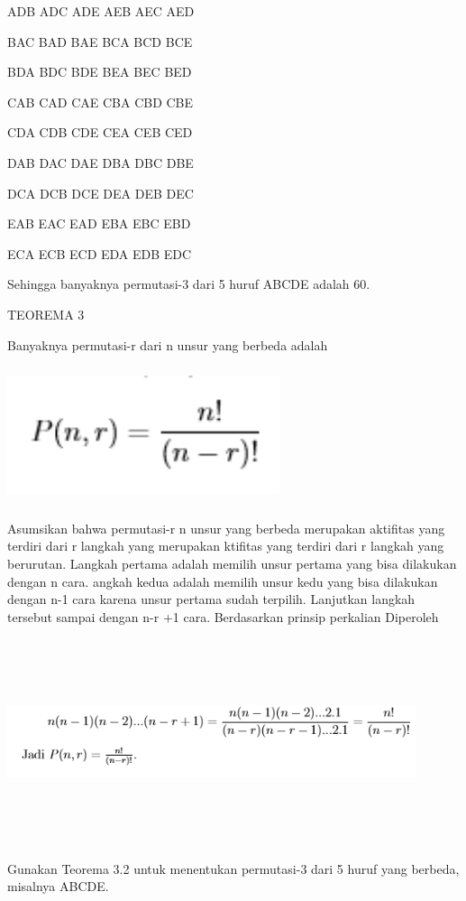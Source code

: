 \documentclass[11pt,fleqn]{book} %
\begin{document}
ADB ADC ADE AEB AEC AED

BAC BAD BAE BCA BCD BCE 

BDA BDC BDE BEA BEC BED 

CAB CAD CAE CBA CBD CBE 

CDA CDB CDE CEA CEB CED 

DAB DAC DAE DBA DBC DBE 

DCA DCB DCE DEA DEB DEC 

EAB EAC EAD EBA EBC EBD 

ECA ECB ECD EDA EDB EDC

Sehingga banyaknya permutasi-3 dari 5 huruf ABCDE adalah 60.


TEOREMA 3

Banyaknya permutasi-r dari n unsur yang berbeda adalah

\includegraphics[width = 8cm, height= 4cm]{Pictures/herlin1.png}

Asumsikan bahwa permutasi-r n unsur yang berbeda merupakan aktifitas yang terdiri dari r langkah yang merupakan ktifitas yang terdiri dari r langkah yang berurutan. Langkah pertama adalah memilih unsur pertama yang bisa dilakukan dengan n cara. angkah kedua adalah memilih unsur kedu yang bisa dilakukan dengan n-1 cara karena unsur pertama sudah terpilih. Lanjutkan langkah tersebut sampai dengan n-r +1 cara. Berdasarkan prinsip perkalian Diperoleh


\includegraphics[width = 12cm, height= 6cm]{Pictures/herlin2.png}

Gunakan Teorema 3.2 untuk menentukan permutasi-3 dari 5 huruf yang berbeda, misalnya ABCDE.
\end{document}
